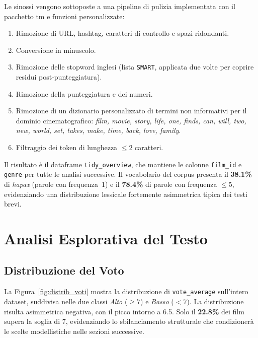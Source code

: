 \documentclass[12pt, a4paper]{article}
\newcommand{\code}[1]{\texttt{#1}}
\newcommand{\pkg}[1]{\textsf{#1}}
\begin{document}
Le sinossi vengono sottoposte a una pipeline di pulizia
implementata con il pacchetto \pkg{tm} e funzioni personalizzate:

\begin{enumerate}[leftmargin=1.8em]
  \item Rimozione di URL, hashtag, caratteri di controllo e
        spazi ridondanti.
  \item Conversione in minuscolo.
  \item Rimozione delle stopword inglesi (lista \texttt{SMART},
        applicata due volte per coprire residui
        post-punteggiatura).
  \item Rimozione della punteggiatura e dei numeri.
  \item Rimozione di un dizionario personalizzato di termini
        non informativi per il dominio cinematografico:
        \textit{film, movie, story, life, one, finds, can, will,
        two, new, world, set, takes, make, time, back,
        love, family}.
  \item Filtraggio dei token di lunghezza $\leq 2$ caratteri.
\end{enumerate}

Il risultato è il dataframe \code{tidy\_overview}, che mantiene
le colonne \code{film\_id} e \code{genre} per tutte le analisi
successive.
Il vocabolario del corpus presenta il \textbf{38.1\%} di
\textit{hapax} (parole con frequenza~1) e il \textbf{78.4\%}
di parole con frequenza $\leq 5$, evidenziando una distribuzione
lessicale fortemente asimmetrica tipica dei testi brevi.


\section{Analisi Esplorativa del Testo}

\subsection{Distribuzione del Voto}

La Figura~\ref{fig:distrib_voti} mostra la distribuzione di
\code{vote\_average} sull'intero dataset, suddivisa nelle due
classi \textit{Alto} ($\geq 7$) e \textit{Basso} ($< 7$).
La distribuzione risulta asimmetrica negativa, con il picco
intorno a 6.5. Solo il \textbf{22.8\%} dei film supera la soglia
di 7, evidenziando lo sbilanciamento strutturale che condizionerà
le scelte modellistiche nelle sezioni successive.
\end{document}
